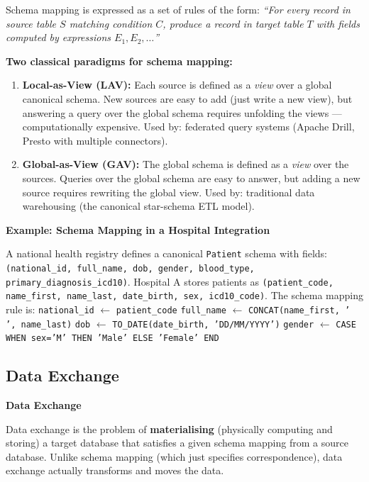\documentclass[12pt,a4paper]{article}
\newcommand{\defbox}[2]{%
  \noindent
  \colorbox{PUNavy!12}{%
    \begin{minipage}{\dimexpr\linewidth-2\fboxsep}
      \vspace{4pt}\textbf{\textcolor{PUNavy}{#1}}\par\vspace{2pt}
      #2\vspace{4pt}
    \end{minipage}%
  }\par\vspace{6pt}%
}
\newcommand{\examplebox}[2]{%
  \noindent
  \colorbox{PUTeal!10}{%
    \begin{minipage}{\dimexpr\linewidth-2\fboxsep}
      \vspace{4pt}\textbf{\textcolor{PUTeal}{Example: #1}}\par\vspace{2pt}
      #2\vspace{4pt}
    \end{minipage}%
  }\par\vspace{6pt}%
}
\begin{document}
Schema mapping is expressed as a set of rules of the form: \textit{``For every record in source table $S$ matching condition $C$, produce a record in target table $T$ with fields computed by expressions $E_1, E_2, \ldots$''}

\textbf{Two classical paradigms for schema mapping:}

\begin{enumerate}[leftmargin=2em, itemsep=6pt]
  \item \textbf{Local-as-View (LAV):} Each source is defined as a \textit{view} over a global canonical schema.  New sources are easy to add (just write a new view), but answering a query over the global schema requires unfolding the views — computationally expensive.  Used by: federated query systems (Apache Drill, Presto with multiple connectors).

  \item \textbf{Global-as-View (GAV):} The global schema is defined as a \textit{view} over the sources.  Queries over the global schema are easy to answer, but adding a new source requires rewriting the global view.  Used by: traditional data warehousing (the canonical star-schema ETL model).
\end{enumerate}

\examplebox{Schema Mapping in a Hospital Integration}{A national health registry defines a canonical \texttt{Patient} schema with fields: \texttt{(national\_id, full\_name, dob, gender, blood\_type, primary\_diagnosis\_icd10)}.  Hospital A stores patients as \texttt{(patient\_code, name\_first, name\_last, date\_birth, sex, icd10\_code)}.  The schema mapping rule is:\newline
\texttt{national\_id} $\leftarrow$ \texttt{patient\_code}\newline
\texttt{full\_name} $\leftarrow$ \texttt{CONCAT(name\_first, ' ', name\_last)}\newline
\texttt{dob} $\leftarrow$ \texttt{TO\_DATE(date\_birth, 'DD/MM/YYYY')}\newline
\texttt{gender} $\leftarrow$ \texttt{CASE WHEN sex='M' THEN 'Male' ELSE 'Female' END}}

\subsection{Data Exchange}

\defbox{Data Exchange}{Data exchange is the problem of \textbf{materialising} (physically computing and storing) a target database that satisfies a given schema mapping from a source database.  Unlike schema mapping (which just specifies correspondence), data exchange actually transforms and moves the data.}
\end{document}
